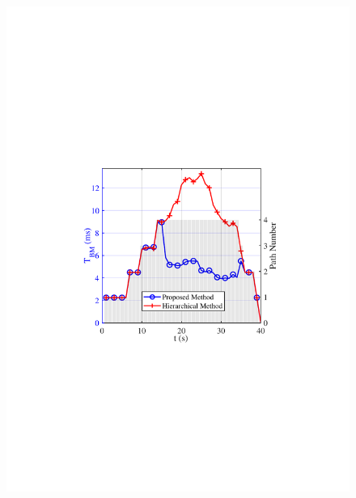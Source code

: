 \documentclass[journal,12pt,onecolumn,draftclsnofoot,]{IEEEtran}
\begin{document}
\begin{figure}
{\hspace{-4.5mm}\includegraphics[scale=0.46]{8-3.pdf}\hspace{-5mm}
}
\quad
\subfloat[]{
}
\end{figure}
\end{document}
